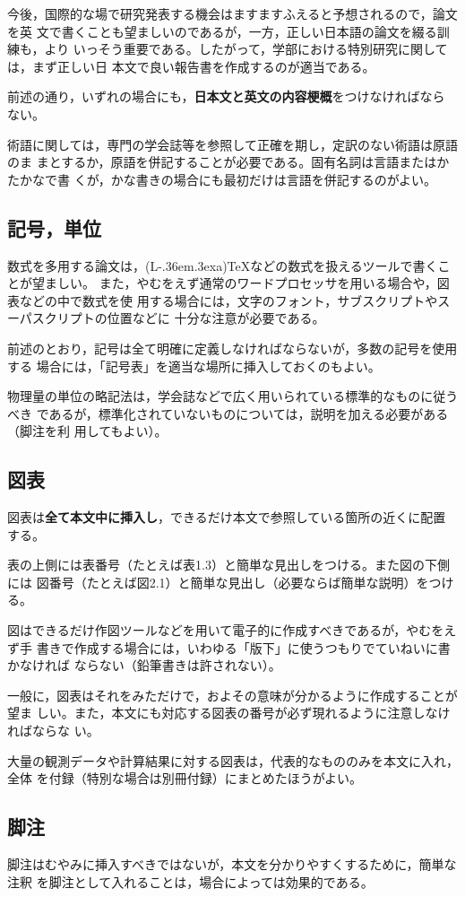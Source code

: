 \documentclass[master]{kuisthesis}		%
\def\LATEX{{\rm (L\kern-.36em\raise.3ex\hbox{\sc a})\TeX}}
\let\EM\bf
\begin{document}
今後，国際的な場で研究発表する機会はますますふえると予想されるので，論文を英
文で書くことも望ましいのであるが，一方，正しい日本語の論文を綴る訓練も，より
いっそう重要である。したがって，学部における特別研究に関しては，まず正しい日
本文で良い報告書を作成するのが適当である。

前述の通り，いずれの場合にも，{\EM 日本文と英文の内容梗概}をつけなければなら
ない。

術語に関しては，専門の学会誌等を参照して正確を期し，定訳のない術語は原語のま
まとするか，原語を併記することが必要である。固有名詞は言語またはかたかなで書
くが，かな書きの場合にも最初だけは言語を併記するのがよい。

\subsection{記号，単位}\label{subsec-symbol}
数式を多用する論文は，\LATEX などの数式を扱えるツールで書くことが望ましい。
また，やむをえず通常のワードプロセッサを用いる場合や，図表などの中で数式を使
用する場合には，文字のフォント，サブスクリプトやスーパスクリプトの位置などに
十分な注意が必要である。

前述のとおり，記号は全て明確に定義しなければならないが，多数の記号を使用する
場合には，「記号表」を適当な場所に挿入しておくのもよい。

物理量の単位の略記法は，学会誌などで広く用いられている標準的なものに従うべき
であるが，標準化されていないものについては，説明を加える必要がある（脚注を利
用してもよい）。

\subsection{図表}\label{subsec-figure}
図表は{\EM 全て本文中に挿入し}，できるだけ本文で参照している箇所の近くに配置
する。

表の上側には表番号（たとえば表1.3）と簡単な見出しをつける。また図の下側には
図番号（たとえば図2.1）と簡単な見出し（必要ならば簡単な説明）をつける。

図はできるだけ作図ツールなどを用いて電子的に作成すべきであるが，やむをえず手
書きで作成する場合には，いわゆる「版下」に使うつもりでていねいに書かなければ
ならない（鉛筆書きは許されない）。

一般に，図表はそれをみただけで，およその意味が分かるように作成することが望ま
しい。また，本文にも対応する図表の番号が必ず現れるように注意しなければならな
い。

大量の観測データや計算結果に対する図表は，代表的なもののみを本文に入れ，全体
を付録（特別な場合は別冊付録）にまとめたほうがよい。

\subsection{脚注}\label{subsec-footnote}
脚注はむやみに挿入すべきではないが，本文を分かりやすくするために，簡単な注釈
を脚注として入れることは，場合によっては効果的である。
\end{document}
